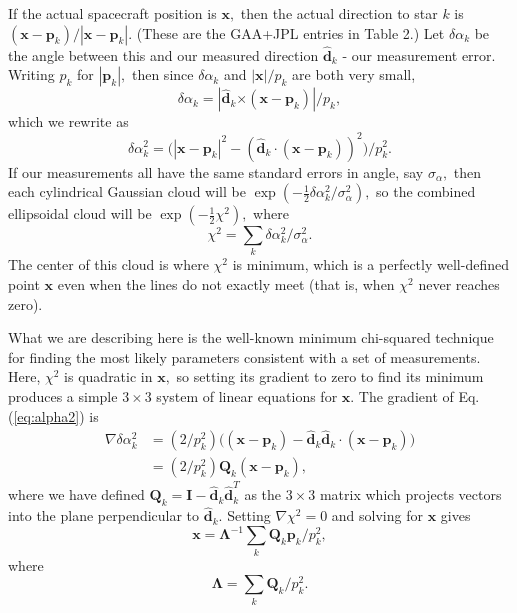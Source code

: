\documentclass[]{aastex63}
\newcommand{\BV}[1]{\mathbf{#1}}
\newcommand{\BH}[1]{\hat{\mathbf{#1}}}
\newcommand{\BL}{\boldsymbol{\Lambda}}
\newcommand{\cross}{\boldsymbol{\times}}
\begin{document}
If the actual spacecraft position is $\BV{x},$ then the actual direction to star $k$ is $(\BV{x}-\BV{p}_k)/|\BV{x}-\BV{p}_k|.$ (These are the GAA+JPL entries in Table 2.)  Let $\delta\alpha_k$ be the angle between this and our measured direction $\BH{d}_k$ - our measurement error.  Writing $p_k$ for $|\BV{p}_k|,$ then since $\delta\alpha_k$ and $|\BV{x}|/p_k$ are both very small,
\begin{equation*} \delta\alpha_k =
  |\BH{d}_k\cross(\BV{x}-\BV{p}_k)|/p_k,
\end{equation*}
which we rewrite as
\begin{equation} \delta\alpha_k^2 = \bigl(|\BV{x}-\BV{p}_k|^2 -
  (\BH{d}_k\cdot(\BV{x}-\BV{p}_k))^2\bigr)/p_k^2.
\label{eq:alpha2}\end{equation}
If our measurements all have the same standard errors in angle, say $\sigma_\alpha,$ then each cylindrical Gaussian cloud will be $\exp(-\tfrac{1}{2}\delta\alpha_k^2/\sigma_\alpha^2),$ so the combined ellipsoidal cloud will be $\exp(-\tfrac{1}{2}\chi^2),$ where
\begin{equation} \chi^2 = \sum_k\delta\alpha_k^2/\sigma_\alpha^2.
\label{eq:chi2}\end{equation}
The center of this cloud is where $\chi^2$ is minimum, which is a perfectly well-defined point $\BV{x}$ even when the lines do not exactly meet (that is, when $\chi^2$ never reaches zero).

What we are describing here is the well-known minimum chi-squared technique for finding the most likely parameters consistent with a set of measurements.  Here, $\chi^2$ is quadratic in $\BV{x},$ so setting its gradient to zero to find its minimum produces a simple $3\times 3$ system of linear equations for $\BV{x}.$ The gradient of Eq.(\ref{eq:alpha2}) is
\begin{align*}
  \nabla\delta\alpha_k^2&= (2/p_k^2)\bigl((\BV{x}-\BV{p}_k)
                          - \BH{d}_k\BH{d}_k\cdot(\BV{x}-\BV{p}_k)\bigr) \\
                        &= (2/p_k^2)\BV{Q}_k(\BV{x}-\BV{p}_k),
\end{align*}
where we have defined $\BV{Q}_k=\BV{I}-\BH{d}_k\BH{d}_k^T$ as the $3\times 3$ matrix which projects vectors into the plane perpendicular to $\BH{d}_k.$  Setting $\nabla\chi^2=0$ and solving for $\BV{x}$ gives
\begin{equation} \BV{x} = \BL^{-1}\sum_k\BV{Q}_k\BV{p}_k/p_k^2,
\label{eq:x}\end{equation}
where
\begin{equation} \BL = \sum_k\BV{Q}_k/p_k^2.
\label{eq:xlambda}\end{equation}
\end{document}
